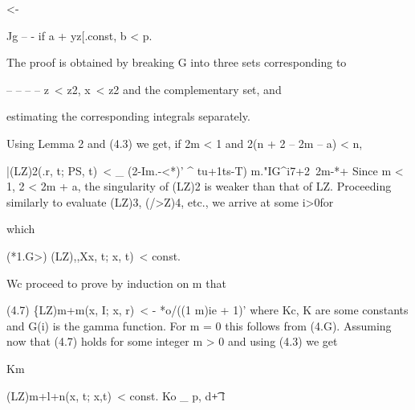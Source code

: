 <-

\begin{ocrformula}
Jg \kh    --              -                                                             if a +
y\a\y             z\th         [.const,                                           b < p.
\end{ocrformula}

The proof is obtained by breaking G into three sets corresponding to

\begin{ocrformula}
--          --           --           --
\y    z\ < \x    z\/2, \y    x\ < \x      z\/2 and the complementary     set, and
\end{ocrformula}

estimating the corresponding integrals separately.

\begin{ocrformula}
Using      Lemma        2 and         (4.3) we get, if 2m <              1 and 2(n +          2 -- 2m -- a) < n,
\end{ocrformula}

\begin{ocrformula}
|(LZ)2(.r, t; PS, t)\ <                     _                                              (2-Im.-<*)'
^        tu+1ts-T)         m."IG^i7+2~2m-*+
Since m <          1, 2 < 2m + a, the singularity of (LZ)2 is weaker than that of LZ.
Proceeding          similarly to evaluate (LZ)3, (/>Z)4, etc., we arrive at some i>0for
\end{ocrformula}

which

\begin{ocrformula}
(*1.G>)                                   (LZ),,Xx,             t; x, t)\ < const.
\end{ocrformula}

Wc proceed to prove by induction on m that

\begin{ocrformula}
(4.7)                     \{LZ)m+m(x,              I; x, r)\ <                            -
*o/((1                     m)ie +       1)'
where  Kc, K are some constants and G(i) is the gamma function. For m = 0
this follows from (4.G). Assuming  now that (4.7) holds for some    integer
m  >  0 and using (4.3) we get
\end{ocrformula}

Km

\begin{ocrformula}
(LZ)m+l+n(x,             t; x,t)\ < const. Ko                                 _
p,               d\t        +     l\
\end{ocrformula}

